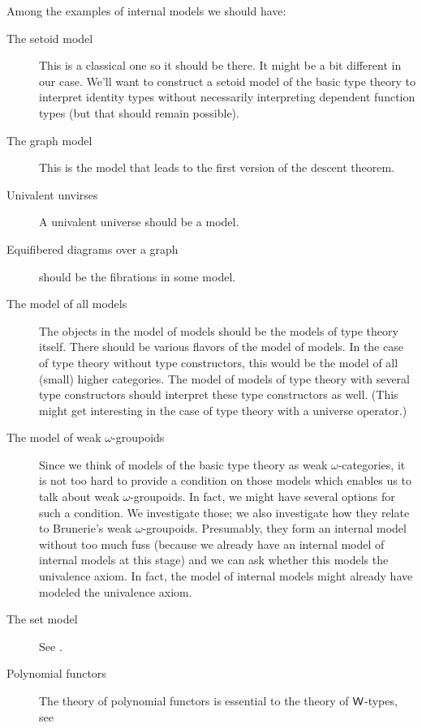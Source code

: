 Among the examples of internal models we should have:
\begin{description}
\item[The setoid model] This is a classical one so it should be there. It might
      be a bit different in our case. We'll want to construct a setoid model
      of the basic type theory to interpret identity types without necessarily
      interpreting dependent function types (but that should remain possible).
\item[The graph model] This is the model that leads to the first version of the
      descent theorem.
\item[Univalent unvirses] A univalent universe should be a model.
\item[Equifibered diagrams over a graph] should be the fibrations in some model.
\item[The model of all models] The objects in the model of models should be
      the models of type theory itself. There should be various flavors of the
      model of models. In the case of type theory without type constructors,
      this would be the model of all (small) higher categories. The model of
      models of type theory with several type constructors should interpret
      these type constructors as well. (This might get interesting in the case
      of type theory with a universe operator.)
\item[The model of weak $\omega$-groupoids] Since we think of models of the
      basic type theory as weak $\omega$-categories, it is not too hard to
      provide a condition on those models which enables us to talk about
      weak $\omega$-groupoids. In fact, we might have several options for such a
      condition. We investigate those; we also investigate how they relate to
      Brunerie's weak $\omega$-groupoids. Presumably, they form an internal
      model without too much fuss (because we already have an internal model
      of internal models at this stage) and we can ask whether this models
      the univalence axiom. In fact, the model of internal models might already
      have modeled the univalence axiom. 
\item[The set model] See \cite{RijkeSpitters:Sets}.
\item[Polynomial functors] The theory of polynomial functors is essential to the
      theory of $\mathsf{W}$-types, see 
\end{description}
